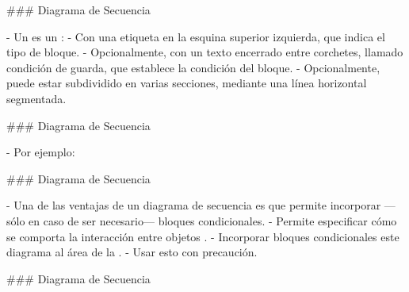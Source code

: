 ### Diagrama de Secuencia


- Un  es un :
    - Con una etiqueta en la esquina superior izquierda, que indica el tipo de bloque.
    - Opcionalmente, con un texto encerrado entre corchetes, llamado condición de guarda, que establece la condición del bloque.
    - Opcionalmente, puede estar subdividido en varias secciones, mediante una línea horizontal segmentada.

### Diagrama de Secuencia


- Por ejemplo:


### Diagrama de Secuencia


- Una de las ventajas de un diagrama de secuencia es que permite incorporar ---sólo en caso
de ser necesario--- bloques condicionales.
    - Permite especificar cómo se comporta la interacción entre objetos .
    - Incorporar bloques condicionales  este diagrama al área de la .
        - Usar esto con precaución.

### Diagrama de Secuencia


